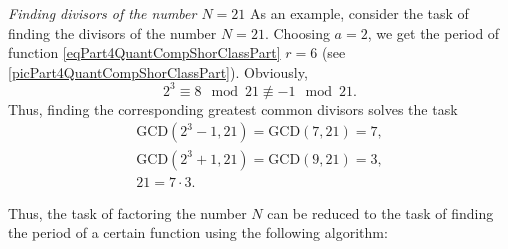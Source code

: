 \begin{example}
\emph{Finding divisors of the number $N=21$}
\label{exPart4QuantCompShorGCD}
As an example, consider the task of finding the divisors of the number $N =
21$. Choosing $a=2$, we get the period of
function \eqref{eqPart4QuantCompShorClassPart} $r = 6$ (see
\autoref{picPart4QuantCompShorClassPart}). 
Obviously, 
\[
2^3 \equiv 8 \mod{21} \not\equiv -1 \mod{21}.
\]
Thus, finding the corresponding greatest common divisors solves
the task
\begin{eqnarray}
\mbox{GCD}\left( 2^3 - 1, 21 \right) = \mbox{GCD}\left( 7, 21 \right)
= 7,
\nonumber \\
\mbox{GCD}\left( 2^3 + 1, 21 \right) = \mbox{GCD}\left( 9, 21 \right)
= 3,
\nonumber \\
21 = 7 \cdot 3.
\nonumber
\end{eqnarray}
\end{example}

Thus, the task of factoring the number $N$ can be reduced to
the task of finding the period of a certain function using the following
algorithm:
